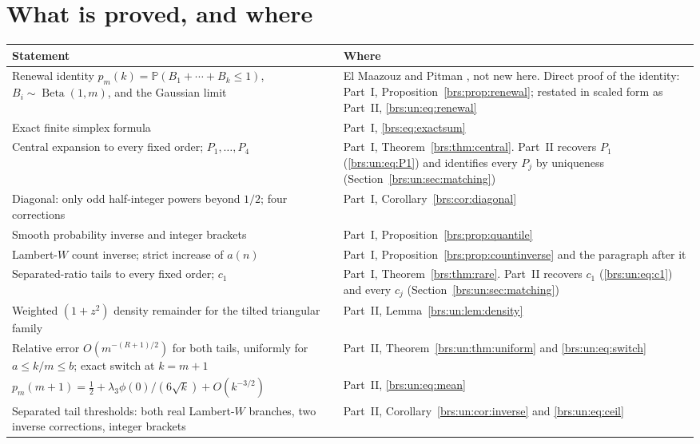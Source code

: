 \documentclass[11pt]{article}
\numberwithin{equation}{section}
\theoremstyle{remark}\newtheorem{remark}[theorem]{Remark}
\newcommand{\Prob}{\mathbb P}\newcommand{\E}{\mathbb E}\newcommand{\He}{\operatorname{He}}
\begin{document}
\section*{What is proved, and where}\label{brs:sec:status}
\begin{center}
\small
\begin{tabular}{@{}>{\raggedright\arraybackslash}p{} >{\raggedright\arraybackslash}p{}@{}}
\toprule
Statement & Where\\
\midrule
Renewal identity $p_m(k)=\Prob(B_1+\cdots+B_k\le1)$, $B_i\sim\operatorname{Beta}(1,m)$, and the Gaussian limit & El Maazouz and Pitman \cite{clock}, not new here. Direct proof of the identity: Part~I, Proposition~\ref{brs:prop:renewal}; restated in scaled form as Part~II, \eqref{brs:un:eq:renewal}\\
Exact finite simplex formula & Part~I, \eqref{brs:eq:exactsum}\\
Central expansion to every fixed order; $P_1,\ldots,P_4$ & Part~I, Theorem~\ref{brs:thm:central}. Part~II recovers $P_1$ (\eqref{brs:un:eq:P1}) and identifies every $P_j$ by uniqueness (Section~\ref{brs:un:sec:matching})\\
Diagonal: only odd half-integer powers beyond $1/2$; four corrections & Part~I, Corollary~\ref{brs:cor:diagonal}\\
Smooth probability inverse and integer brackets & Part~I, Proposition~\ref{brs:prop:quantile}\\
Lambert-$W$ count inverse; strict increase of $a(n)$ & Part~I, Proposition~\ref{brs:prop:countinverse} and the paragraph after it\\
Separated-ratio tails to every fixed order; $c_1$ & Part~I, Theorem~\ref{brs:thm:rare}. Part~II recovers $c_1$ (\eqref{brs:un:eq:c1}) and every $c_j$ (Section~\ref{brs:un:sec:matching})\\
Weighted $(1+z^2)$ density remainder for the tilted triangular family & Part~II, Lemma~\ref{brs:un:lem:density}\\
Relative error $O(m^{-(R+1)/2})$ for both tails, uniformly for $a\le k/m\le b$; exact switch at $k=m+1$ & Part~II, Theorem~\ref{brs:un:thm:uniform} and \eqref{brs:un:eq:switch}\\
$p_m(m+1)=\frac12+\lambda_3\phi(0)/(6\sqrt k)+O(k^{-3/2})$ & Part~II, \eqref{brs:un:eq:mean}\\
Separated tail thresholds: both real Lambert-$W$ branches, two inverse corrections, integer brackets & Part~II, Corollary~\ref{brs:un:cor:inverse} and \eqref{brs:un:eq:ceil}\\

\end{tabular}
\end{center}
\end{document}
